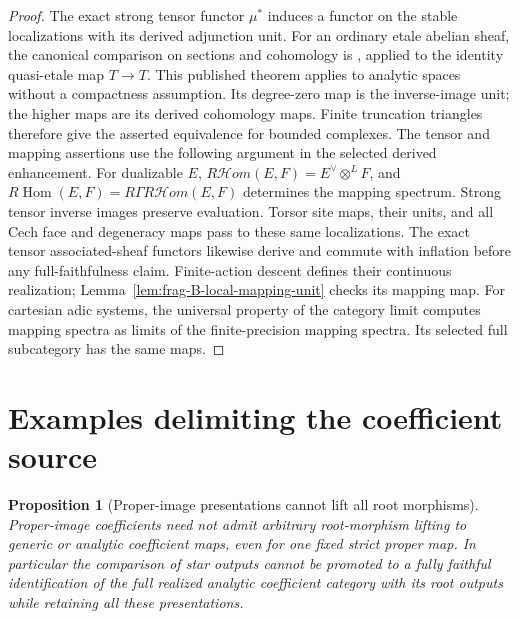 \documentclass[11pt]{article}
\newtheorem{proposition}[theorem]{Proposition}
\theoremstyle{definition}
\theoremstyle{remark}
\begin{document}
\begin{proof}
The exact strong tensor functor $\mu^*$ induces a functor on the
stable localizations with its derived adjunction unit.  For an ordinary
etale abelian sheaf, the canonical comparison on
sections and cohomology is \cite[Theorem 3.3(i)--(ii)]{BerkovichFormalI},
applied to the identity quasi-etale map $T\to T$.
This published theorem applies to analytic spaces without a
compactness assumption.  Its degree-zero map is the inverse-image
unit; the higher maps are its derived cohomology maps.  Finite
truncation triangles therefore give the asserted equivalence for
bounded complexes.  The tensor and mapping assertions
use the following argument in the selected derived enhancement.
For dualizable $E$, $R\mathcal Hom(E,F)=E^\vee\otimes^LF$, and
$R\operatorname{Hom}(E,F)=R\Gamma R\mathcal Hom(E,F)$ determines
the mapping spectrum.  Strong tensor inverse images preserve evaluation.
Torsor site maps, their units, and all Cech face and degeneracy maps
pass to these same localizations.  The exact tensor associated-sheaf
functors likewise derive and commute with inflation before any
full-faithfulness claim.  Finite-action descent defines their continuous
realization; Lemma~\ref{lem:frag-B-local-mapping-unit} checks its mapping map.
For cartesian adic systems, the universal property of the category
limit computes mapping spectra as limits of the finite-precision
mapping spectra.  Its selected full subcategory has the same maps.
\end{proof}

\section{Examples delimiting the coefficient source}
\label{sec:source-obstructions}

\begin{proposition}[Proper-image presentations cannot lift all root morphisms]
\label{prop:frag-B-proper-morphism-obstruction}
Proper-image coefficients need not admit arbitrary
root-morphism lifting to generic or analytic coefficient maps,
even for one fixed strict proper map.  In particular the comparison
of star outputs cannot be promoted to a fully faithful identification
of the full realized analytic coefficient category with its root
outputs while retaining all these presentations.
\end{proposition}
\end{document}
